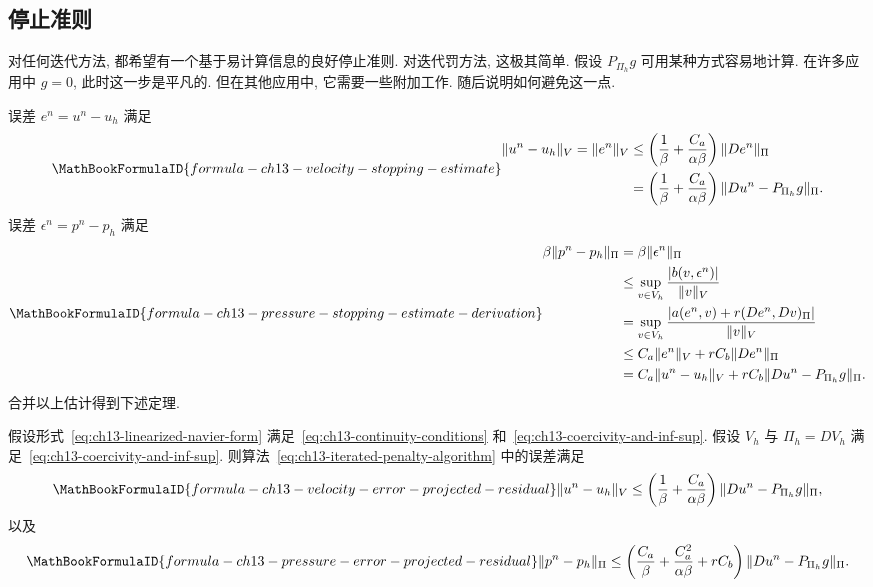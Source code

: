 \subsection{停止准则}
\label{sec:ch13-stopping-criteria}
\setcounter{thmcount}{0}
\setcounter{equation}{0}

对任何迭代方法, 都希望有一个基于易计算信息的良好停止准则. 对迭代罚方法, 这极其简单. 假设 $P_{\Pi_h}g$ 可用某种方式容易地计算. 在许多应用中 $g=0$, 此时这一步是平凡的. 但在其他应用中, 它需要一些附加工作. 随后说明如何避免这一点.

误差 $e^n=u^n-u_h$ 满足
\begin{equation}
\MathBookFormulaID{formula-ch13-velocity-stopping-estimate}
\label{eq:ch13-velocity-stopping-estimate}
\begin{aligned}
\|u^n-u_h\|_V=\|e^n\|_V
&\leq\left(\frac1\beta+\frac{C_a}{\alpha\beta}\right)\|De^n\|_\Pi\\
&=\left(\frac1\beta+\frac{C_a}{\alpha\beta}\right)
\|Du^n-P_{\Pi_h}g\|_\Pi.
\end{aligned}
\end{equation}
误差 $\epsilon^n=p^n-p_h$ 满足
\[
\MathBookFormulaID{formula-ch13-pressure-stopping-estimate-derivation}
\begin{aligned}
\beta\|p^n-p_h\|_\Pi
&=\beta\|\epsilon^n\|_\Pi\\
&\leq\sup_{v\in V_h}\frac{|b(v,\epsilon^n)|}{\|v\|_V}\\
&=\sup_{v\in V_h}
\frac{|a(e^n,v)+r(De^n,Dv)_\Pi|}{\|v\|_V}\\
&\leq C_a\|e^n\|_V+rC_b\|De^n\|_\Pi\\
&=C_a\|u^n-u_h\|_V+rC_b\|Du^n-P_{\Pi_h}g\|_\Pi.
\end{aligned}
\]
合并以上估计得到下述定理.

\begin{Theorem}
\label{thm:ch13-iterated-penalty-stopping-errors}
假设形式~\eqref{eq:ch13-linearized-navier-form} 满足~\eqref{eq:ch13-continuity-conditions} 和~\eqref{eq:ch13-coercivity-and-inf-sup}. 假设 $V_h$ 与 $\Pi_h=DV_h$ 满足~\eqref{eq:ch13-coercivity-and-inf-sup}. 则算法~\eqref{eq:ch13-iterated-penalty-algorithm} 中的误差满足
\begin{equation}
\MathBookFormulaID{formula-ch13-velocity-error-projected-residual}
\label{eq:ch13-velocity-error-projected-residual}
\|u^n-u_h\|_V
\leq\left(\frac1\beta+\frac{C_a}{\alpha\beta}\right)
\|Du^n-P_{\Pi_h}g\|_\Pi,
\end{equation}
以及
\begin{equation}
\MathBookFormulaID{formula-ch13-pressure-error-projected-residual}
\label{eq:ch13-pressure-error-projected-residual}
\|p^n-p_h\|_\Pi
\leq\left(\frac{C_a}{\beta}+\frac{C_a^2}{\alpha\beta}+rC_b\right)
\|Du^n-P_{\Pi_h}g\|_\Pi.
\end{equation}
\end{Theorem}

